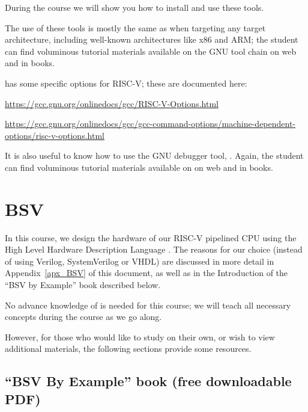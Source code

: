 During the course we will show you how to install and use these tools.

The use of these tools is mostly the same as when targeting any target
architecture, including well-known architectures like x86 and ARM; the
student can find voluminous tutorial materials available on the GNU
tool chain on web and in books.

{\gcc} has some specific options for RISC-V; these are documented here:

\begin{tightlist}
  \item
  \url{https://gcc.gnu.org/onlinedocs/gcc/RISC-V-Options.html}

  \item
  \url{https://gcc.gnu.org/onlinedocs/gcc/gcc-command-options/machine-dependent-options/risc-v-options.html}
\end{tightlist}

It is also useful to know how to use the GNU debugger tool, {\gdb}.
Again, the student can find voluminous tutorial materials available on
on web and in books.


\section{BSV}

In this course, we design the hardware of our RISC-V pipelined CPU
using the High Level Hardware Description Language {\BSV}.  The
reasons for our choice (instead of using Verilog, SystemVerilog or
VHDL) are discussed in more detail in Appendix~\ref{apx_BSV} of this
document, as well as in the Introduction of the ``BSV by Example''
book described below.

No advance knowledge of {\BSV} is needed for this course; we will
teach all necessary {\BSV} concepts during the course as we go along.

However, for those who would like to study {\BSV} on their own, or
wish to view additional {\BSV} materials, the following sections
provide some resources.


\subsection{``BSV By Example'' book (free downloadable PDF)}

